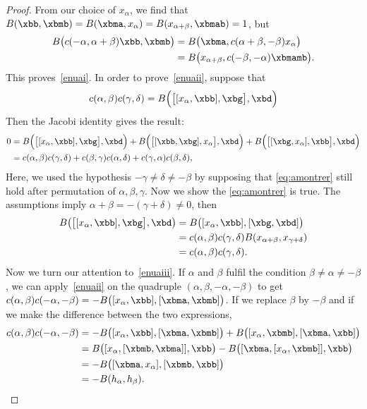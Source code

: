 \begin{proof}
	From our choice of $ x_{\alpha}$, we find that $B(\xbb,\xbmb)=B(\xbma, x_{\alpha})=B(x_{\alpha+\beta},\xbmab)=1$, but
	\begin{equation}
		\begin{split}
			B\big(c(-\alpha,\alpha+\beta)\xbb,\xbmb\big)&=B\big(\xbma,c(\alpha+\beta,-\beta) x_{\alpha}\big)\\
			&=B\big(x_{\alpha+\beta},c(-\beta,-\alpha)\xbmamb \big).
		\end{split}
	\end{equation}
	This proves~\ref{enuai}. In order to prove~\ref{enuaii}, suppose that
	\begin{equation}\label{eq:amontrer}
		c(\alpha,\beta)c(\gamma,\delta)=B\Big(  \big[[ x_{\alpha},\xbb],\xbg\big] ,\xbd  \Big)
	\end{equation}
	Then the Jacobi identity gives the result:
	\begin{equation}
		\begin{split}
			0&=B\Big( \big[[ x_{\alpha},\xbb],\xbg\big],\xbd \Big)+B\Big(\big[[\xbb,\xbg], x_{\alpha}\big],\xbd\Big)+B\Big(\big[[\xbg, x_{\alpha}],\xbb\big] ,\xbd\Big)\\
			&=c(\alpha,\beta)c(\gamma,\delta)+c(\beta,\gamma)c(\alpha,\delta)+c(\gamma,\alpha)c(\beta,\delta),
		\end{split}
	\end{equation}
	Here, we used the hypothesis $-\gamma\neq\delta\neq -\beta$ by supposing that \eqref{eq:amontrer} still hold after permutation of $\alpha,\beta,\gamma$.
	Now we show the \eqref{eq:amontrer} is true. The assumptions imply  $\alpha+\beta=-(\gamma+\delta)\neq 0$, then
	\begin{equation}
		\begin{split}
			B\big(\big[[ x_{\alpha},\xbb],\xbg \big],\xbd\big)&=B\big( [ x_{\alpha},\xbb],[\xbg,\xbd]  \big)\\
			&=c(\alpha,\beta)c(\gamma,\delta)B(x_{\alpha+\beta},x_{\gamma+\delta})\\
			&=c(\alpha,\beta)c(\gamma,\delta).
		\end{split}
	\end{equation}
	Now we turn our attention to~\ref{enuaiii}. If $\alpha$ and $\beta$ fulfil the condition $\beta\neq\alpha\neq-\beta$, we can apply~\ref{enuaii} on the quadruple $(\alpha,\beta,-\alpha,-\beta)$ to get $c(\alpha,\beta)c(-\alpha,-\beta)=
		-B\big(   [ x_{\alpha},\xbb],[\xbma,\xbmb]   \big)$.
	If we replace $\beta$ by $-\beta$ and if we make the difference between the two expressions,
	\begin{equation}
		\begin{split}
			c(\alpha,\beta)c(-\alpha,-\beta)&=-B\big(   [ x_{\alpha},\xbb],[\xbma,\xbmb]    \big)+B\big(   [ x_{\alpha},\xbmb],[\xbma,\xbb]    \big)\\
			&=B\big( [ x_{\alpha},[\xbmb,\xbma]],\xbb \big)-B\big(
			[\xbma,[ x_{\alpha},\xbmb]],\xbb \big)\\
			&=-B\big( [\xbma, x_{\alpha}],[\xbmb,\xbb]  \big) \\
			&=-B(h_{\alpha},h_{\beta}).
		\end{split}
	\end{equation}


\end{proof}
